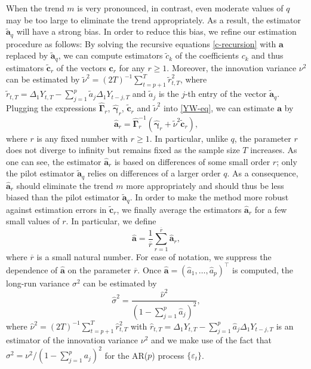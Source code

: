 When the trend $m$ is very pronounced, in contrast, even moderate values of $q$ may be too large to eliminate the trend appropriately. As a result, the estimator $\widetilde{\boldsymbol{a}}_q$ will have a strong bias. In order to reduce this bias, we refine our estimation procedure as follows: By solving the recursive equations \eqref{c-recursion} with $\boldsymbol{a}$ replaced by $\widetilde{\boldsymbol{a}}_q$, we can compute estimators $\widetilde{c}_k$ of the coefficients $c_k$ and thus estimators $\widetilde{\boldsymbol{c}}_r$ of the vectors $\boldsymbol{c}_r$ for any $r \ge 1$. Moreover, the innovation variance $\nu^2$ can be estimated by $\widetilde{\nu}^2 = (2T)^{-1} \sum_{t=p+1}^T \widetilde{r}_{t,T}^2$, where $\widetilde{r}_{t,T} = \Delta_1 Y_{t,T} - \sum_{j=1}^p \widetilde{a}_j \Delta_1 Y_{t-j,T}$ and $\widetilde{a}_j$ is the $j$-th entry of the vector $\widetilde{\boldsymbol{a}}_q$. Plugging the expressions $\widehat{\boldsymbol{\Gamma}}_r$, $\widehat{\boldsymbol{\gamma}}_r$, $\widetilde{\boldsymbol{c}}_r$ and $\widetilde{\nu}^2$ into \eqref{YW-eq}, we can estimate $\boldsymbol{a}$ by 
\begin{equation}\label{est-AR-SS} 
\widehat{\boldsymbol{a}}_r = \widehat{\boldsymbol{\Gamma}}_r^{-1} (\widehat{\boldsymbol{\gamma}}_r + \widetilde{\nu}^2 \widetilde{\boldsymbol{c}}_r),
\end{equation} 
where $r$ is any fixed number with $r \ge 1$. In particular, unlike $q$, the parameter $r$ does not diverge to infinity but remains fixed as the sample size $T$ increases. As one can see, the estimator $\widehat{\boldsymbol{a}}_r$ is based on differences of some small order $r$; only the pilot estimator $\widetilde{\boldsymbol{a}}_q$ relies on differences of a larger order $q$. As a consequence, $\widehat{\boldsymbol{a}}_r$ should eliminate the trend $m$ more appropriately and should thus be less biased than the pilot estimator $\widetilde{\boldsymbol{a}}_q$. In order to make the method more robust against estimation errors in $\widetilde{\boldsymbol{c}}_r$, we finally average the estimators $\widehat{\boldsymbol{a}}_r$ for a few small values of $r$. In particular, we define  
\begin{equation}\label{est-AR}
\widehat{\boldsymbol{a}} = \frac{1}{\overline{r}} \sum\limits_{r=1}^{\overline{r}} \widehat{\boldsymbol{a}}_r, 
\end{equation}
where $\overline{r}$ is a small natural number. For ease of notation, we suppress the dependence of $\widehat{\boldsymbol{a}}$ on the parameter $\overline{r}$. Once $\widehat{\boldsymbol{a}} =(\widehat{a}_1,\ldots,\widehat{a}_p)^\top$ is computed, the long-run variance $\sigma^2$ can be estimated by 
\begin{equation} \label{est-lrv}
\widehat{\sigma}^2 = \frac{\widehat{\nu}^2}{(1 - \sum_{j=1}^p \widehat{a}_j)^2}, 
\end{equation}
where $\widehat{\nu}^2 = (2T)^{-1} \sum_{t=p+1}^T \widehat{r}_{t,T}^2$ with $\widehat{r}_{t,T} = \Delta_1 Y_{t,T} - \sum_{j=1}^p \widehat{a}_j \Delta_1 Y_{t-j,T}$ is an estimator of the innovation variance $\nu^2$ and we make use of the fact that $\sigma^2 = \nu^2 / (1 - \sum_{j=1}^p a_j)^2$ for the AR($p$) process $\{\varepsilon_t\}$. 


